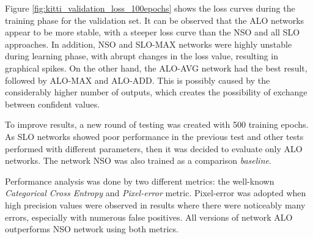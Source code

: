 Figure \ref{fig:kitti_validation_loss_100epochs} shows the loss curves during the training phase for the validation set.
It can be observed that the ALO networks appear to be more stable, with a steeper loss curve than the NSO and all SLO approaches.
In addition, NSO and SLO-MAX networks were highly unstable during learning phase, with abrupt changes in the loss value, resulting in graphical spikes.
On the other hand, the ALO-AVG network had the best result, followed by ALO-MAX and ALO-ADD.
This is possibly caused by the considerably higher number of outputs, which creates the possibility of exchange between confident values.

To improve results, a new round of testing was created with 500 training epochs.
As SLO networks showed poor performance in the previous test and other tests performed with different parameters, then it was decided to evaluate only ALO networks.
The network NSO was also trained as a comparison \textit{baseline}.

% 

Performance analysis was done by two different metrics: the well-known \textit{Categorical Cross Entropy} and \textit{Pixel-error} metric.
Pixel-error was adopted when high precision values were observed in results where there were noticeably many errors, especially with numerous false positives.
All versions of network ALO outperforms NSO network using both metrics.

